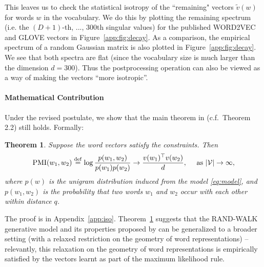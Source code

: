 \documentclass{article} \usepackage{acl2017,times}
\newtheorem{theorem}{Theorem}[section]
\begin{document}
This  leaves us  to check the statistical isotropy of the 
``remaining" vectors $\tilde{v}(w)$ for words $w$ in the vocabulary.  We do this by  plotting the  remaining spectrum (i.e. the $(D+1)$-th, ..., 300th singular values) for the published  WORD2VEC and GLOVE  vectors in Figure~\ref{app:fig:decay}. As a comparison, the empirical spectrum of  a  random Gaussian matrix  is also  plotted in Figure~\ref{app:fig:decay}.  We see that both spectra are  flat (since the vocabulary size is much larger than the dimension $d = 300$).  Thus the postprocessing operation can also be viewed as a way of making the vectors ``more isotropic''.


\paragraph{Mathematical Contribution} Under the revised postulate, we show that the main theorem in \citep{arora2015rand} (c.f.\ Theorem 2.2) still holds. Formally:  
\begin{theorem}
\label{thm:iso}
Suppose the word vectors satisfy the constraints. Then 
\begin{align}
  {\rm PMI}(w_1, w_2) \stackrel{{\rm def}}{=} \log \frac{p(w_1,w_2)}{p(w_1)p(w_2)}  \to \frac{v(w_1)^{\top}v(w_2)}{d},\quad  \textrm{ as $|\mathcal{V}|\to \infty$}, \label{eq:iso}
\end{align}
where $p(w)$ is the unigram distribution induced from the model \eqref{eq:model}, and $p(w_1,w_2)$ is the probability that two words $w_1$ and $w_2$ occur with each other within distance $q$.
\end{theorem}

The proof is in Appendix~\ref{app:iso}. Theorem~\ref{thm:iso} suggests that the RAND-WALK generative model and its properties proposed by \citep{arora2015rand} can be generalized to a broader setting (with a relaxed restriction on the geometry of word representations) -- relevantly, this relaxation on the geometry of word representations is empirically satisfied by the vectors learnt as part of the maximum likelihood rule. 
\end{document}
